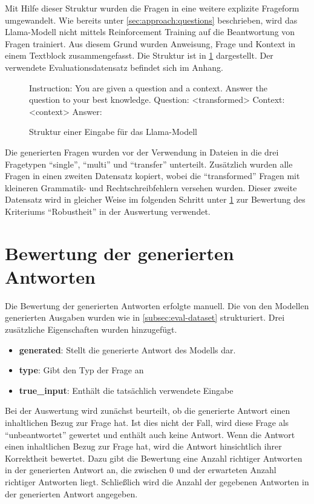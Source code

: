 Mit Hilfe dieser Struktur wurden die Fragen in eine weitere explizite Frageform umgewandelt.
Wie bereits unter \cref{sec:approach:questions} beschrieben, wird das Llama-Modell nicht mittels Reinforcement Training auf die Beantwortung von Fragen trainiert.
Aus diesem Grund wurden Anweisung, Frage und Kontext in einem Textblock zusammengefasst.
Die Struktur ist in \cref{fig:llama-input} dargestellt.
Der verwendete Evaluationsdatensatz befindet sich im Anhang.\\

\begin{figure}
    \begin{verbbox}
        Instruction: You are given a question and a context. Answer the question to your best knowledge.
        Question: <transformed>
        Context: <context>
        Answer: 
    \end{verbbox}
    \resizebox{1.2\textwidth}{!}{\theverbbox}
    \caption{Struktur einer Eingabe für das Llama-Modell}\label{fig:llama-input}
\end{figure}

Die generierten Fragen wurden vor der Verwendung in Dateien in die drei Fragetypen \enquote{single}, \enquote{multi} und \enquote{transfer} unterteilt.
Zusätzlich wurden alle Fragen in einen zweiten Datensatz kopiert, wobei die \enquote{transformed} Fragen mit kleineren Grammatik- und Rechtschreibfehlern versehen wurden.
Dieser zweite Datensatz wird in gleicher Weise im folgenden Schritt unter \cref{sec:answer-rating} zur Bewertung des Kriteriums \enquote{Robustheit} in der Auswertung verwendet.

\section{Bewertung der generierten Antworten}\label{sec:answer-rating}
Die Bewertung der generierten Antworten erfolgte manuell.
Die von den Modellen generierten Ausgaben wurden wie in \cref{subsec:eval-dataset} strukturiert. Drei zusätzliche Eigenschaften wurden hinzugefügt.
\begin{itemize}
    \item \textbf{generated}: Stellt die generierte Antwort des Modells dar.
    \item \textbf{type}: Gibt den Typ der Frage an
    \item \textbf{true\_input}: Enthält die tatsächlich verwendete Eingabe
\end{itemize}

Bei der Auswertung wird zunächst beurteilt, ob die generierte Antwort einen inhaltlichen Bezug zur Frage hat.
Ist dies nicht der Fall, wird diese Frage als \enquote{unbeantwortet} gewertet und enthält auch keine Antwort.
Wenn die Antwort einen inhaltlichen Bezug zur Frage hat, wird die Antwort hinsichtlich ihrer Korrektheit bewertet.
Dazu gibt die Bewertung eine Anzahl richtiger Antworten in der generierten Antwort an, die zwischen 0 und der erwarteten Anzahl richtiger Antworten liegt.
Schließlich wird die Anzahl der gegebenen Antworten in der generierten Antwort angegeben.\\

